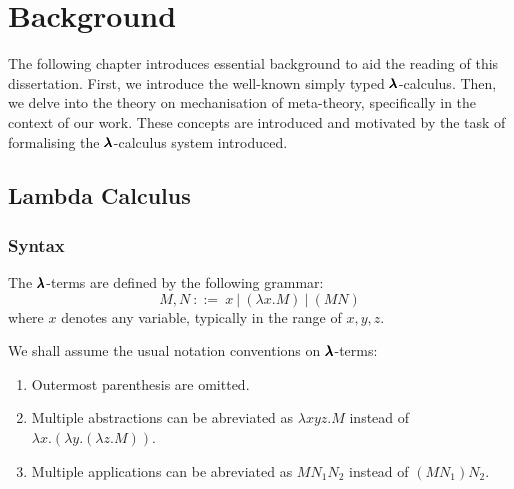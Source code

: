 \chapter{Background}
\label{c:background}


The following chapter introduces essential background to aid the reading of this dissertation.
First, we introduce the well-known simply typed $\pmb{\lambda}$-calculus.
Then, we delve into the theory on mechanisation of meta-theory, specifically in the context of our work.
These concepts are introduced and motivated by the task of formalising the $\pmb{\lambda}$-calculus system introduced.

\section{Lambda Calculus}

\subsection{Syntax}

\cite{Hindley1997} \cite{Barendregt1987}

\begin{definition}
  The $\pmb{\lambda}$-terms are defined by the following grammar:
  \[ M, N \ ::= \ x \ | \ (\lambda x . M) \ | \ (M N) \]
  where $x$ denotes any variable, typically in the range of $x, y, z$.
\end{definition}

\begin{notation}
  We shall assume the usual notation conventions on $\pmb{\lambda}$-terms:

  \begin{enumerate}
  \item Outermost parenthesis are omitted.
  \item Multiple abstractions can be abreviated as $\lambda x y z . M$ instead of  $\lambda x . (\lambda y . (\lambda z . M))$.
  \item Multiple applications can be abreviated as $M N_1 N_2$ instead of $(M N_1) N_2$.
  \end{enumerate}
\end{notation}

